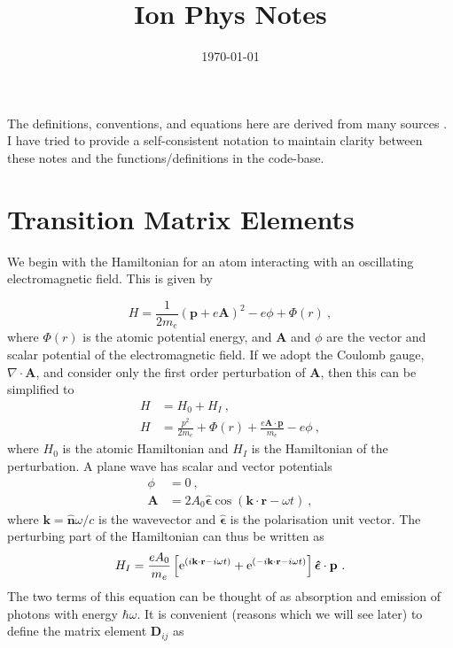 \documentclass{article}
\title{Ion Phys Notes}
\author{}
\date{\today}
\begin{document}
\maketitle
The definitions, conventions, and equations here are derived from many sources \cite{Loudon2000, Bransden2003, Auzinsh2010, Foot2005, Bernadotte2012}. I have tried to provide a self-consistent notation to maintain clarity between these notes and the functions/definitions in the code-base.  

\section{Transition Matrix Elements}
We begin with the Hamiltonian for an atom interacting with an oscillating electromagnetic field. This is given by 

\begin{equation}
    H = \frac{1}{2m_e}\left(\mathbf{p} + e\mathbf{A}\right)^2 - e\phi + \Phi(r)~,
\end{equation}
where $\Phi(r)$ is the atomic potential energy, and $\mathbf{A}$ and $\phi$ are the vector and scalar potential of the electromagnetic field. If we adopt the Coulomb gauge, $\nabla \cdot \mathbf{A}$, and consider only the first order perturbation of $\mathbf{A}$, then this can be simplified to 
\begin{align}
    H &= H_0 + H_I ~,\\
    H &= \frac{p^2}{2m_e} + \Phi(r) +  \frac{e\mathbf{A}\cdot\mathbf{p}}{m_e}-e\phi~,
\end{align}
where $H_0$ is the atomic Hamiltonian and $H_I$ is the Hamiltonian of the perturbation. A plane wave has scalar and vector potentials  
\begin{align}
    \phi &= 0~, \\
    \mathbf{A} &= 2A_0 \boldsymbol{\hat{\epsilon}} \cos{(\mathbf{k}\cdot\mathbf{r} -\omega t)}~,
\end{align}
where $\mathbf{k} = \mathbf{\hat{n}}\omega/c$ is the wavevector and $\boldsymbol{\hat{\epsilon}}$ is the polarisation unit vector. The perturbing part of the Hamiltonian can thus be written as 
\begin{equation}
    H_I = \frac{eA_0}{m_e}\left[ {\rm{e}}^{(i\mathbf{k}\cdot\mathbf{r} - i\omega t)} +  {\rm{e}}^{(-i\mathbf{k}\cdot\mathbf{r} - i\omega t)}\right] \boldsymbol{\hat{\epsilon}} \cdot \mathbf{p}~.
\end{equation}
The two terms of this equation can be thought of as absorption and emission of photons with energy $\hbar \omega$. It is convenient (reasons which we will see later) to define the matrix element $\mathbf{D}_{ij}$ as 
\end{document}
